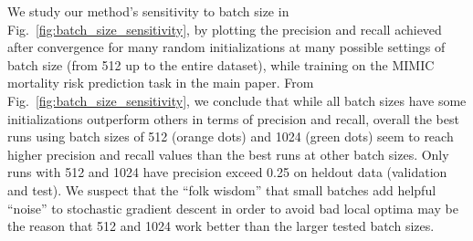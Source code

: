 We study our method's sensitivity to batch size in Fig.~\ref{fig:batch_size_sensitivity}, by plotting the precision and recall achieved after convergence for many random initializations at many possible settings of batch size (from 512 up to the entire dataset), while training on the MIMIC mortality risk prediction task in the main paper. From Fig.~\ref{fig:batch_size_sensitivity}, we conclude that while all batch sizes have some initializations outperform others in terms of precision and recall, overall the best runs using batch sizes of 512 (orange dots) and 1024 (green dots) seem to reach higher precision and recall values than the best runs at other batch sizes. Only runs with 512 and 1024 have precision exceed 0.25 on heldout data (validation and test). We suspect that the ``folk wisdom'' that small batches add helpful ``noise'' to stochastic gradient descent in order to avoid bad local optima may be the reason that 512 and 1024 work better than the larger tested batch sizes.
